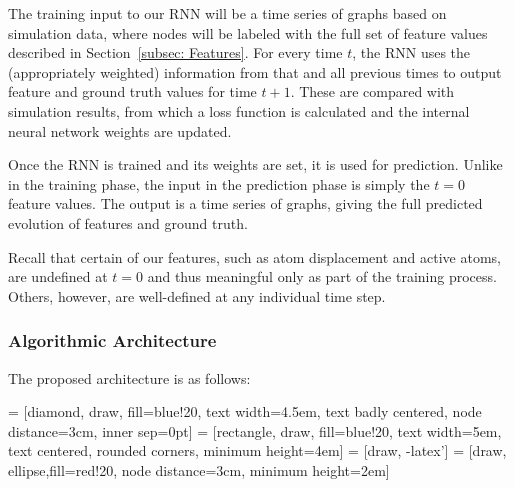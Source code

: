 The training input to our RNN will be a time series of graphs based on simulation data, where nodes will be labeled with the full set of feature values described in Section~\ref{subsec: Features}.  For every time $t$, the RNN uses the (appropriately weighted) information from that and all previous times to output feature and ground truth values for time $t+1$.  These are compared with simulation results, from which a loss function is calculated and the internal neural network weights are updated.

Once the RNN is trained and its weights are set, it is used for prediction.  Unlike in the training phase, the input in the prediction phase is simply the $t=0$ feature values.  The output is a time series of graphs, giving the full predicted evolution of features and ground truth.

Recall that certain of our features, such as atom displacement and active atoms, are undefined at $t=0$ and thus meaningful only as part of the training process.  Others, however, are well-defined at any individual time step.

\subsubsection{Algorithmic Architecture}


The proposed architecture is as follows:

\bigskip

\begin{center}
 = [diamond, draw, fill=blue!20, 
    text width=4.5em, text badly centered, node distance=3cm, inner sep=0pt]
 = [rectangle, draw, fill=blue!20, 
    text width=5em, text centered, rounded corners, minimum height=4em]
 = [draw, -latex']
 = [draw, ellipse,fill=red!20, node distance=3cm,
    minimum height=2em]
    
\end{center}

